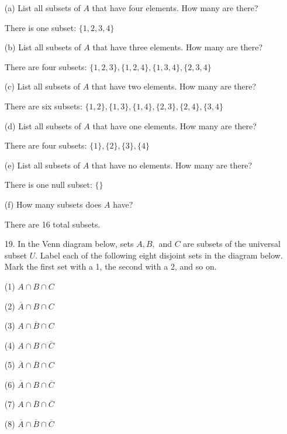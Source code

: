 \documentclass{article}
\begin{document}
\begin{itemize}
    (a) List all subsets of $A$ that have four elements. How many are there?
    
    {\color{blue}There is one subset: $\{1, 2, 3, 4\}$ }
    
    (b) List all subsets of $A$ that have three elements. How many are there?
    
    {\color{blue}There are four subsets: $\{1, 2, 3\}, \{1, 2, 4\}, \{1, 3, 4\}, \{2, 3, 4\}$}
    
    (c) List all subsets of $A$ that have two elements. How many are there?
    
    {\color{blue} There are six subsets: $\{1, 2\}, \{1, 3\}, \{1, 4\}, \{2, 3\}, \{2, 4\}, \{3, 4\}$}
    
    \newpage
    
    (d) List all subsets of $A$ that have one elements. How many are there?
    
    {\color{blue} There are four subsets: $\{1\}, \{2\}, \{3\}, \{4\}$}
    
    (e) List all subsets of $A$ that have no elements. How many are there?
    
    {\color{blue} There is one null subset: $\{\}$}
    
    (f) How many subsets does $A$ have?
    
    {\color{blue} There are 16 total subsets.}
    
    \item[19.] In the Venn diagram below, sets $A, B,$ and $C$ are subsets of the universal subset $U$.  Label each of the following eight disjoint sets in the diagram below.  Mark the first set with a 1, the second with a 2, and so on.
    
    \begin{multicols}{2}
    
    (1) $A \cap B \cap C$
    
    (2) $\overline{A} \cap B \cap C$
    
    (3) $A \cap \overline{B} \cap C$
    
    (4) $A \cap B \cap \overline{C}$
    
    \columnbreak
    
    (5) $\overline{A} \cap \overline{B} \cap C$
    
    (6) $\overline{A} \cap B \cap \overline{C}$
    
    (7) $A \cap \overline{B} \cap \overline{C}$
    
    (8) $\overline{A} \cap \overline{B} \cap \overline{C}$
    

\end{multicols}
\end{itemize}
\end{document}
